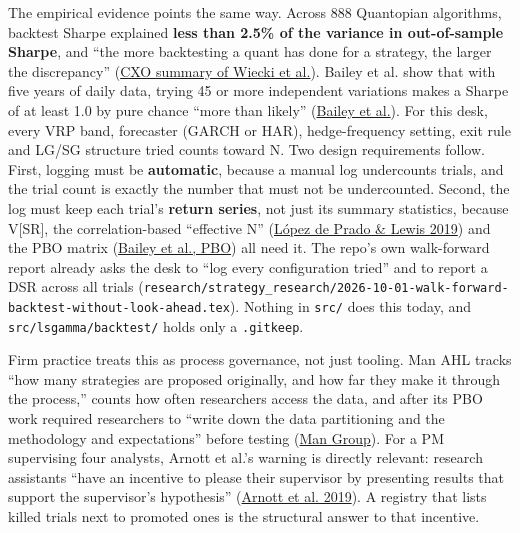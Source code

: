 \documentclass{article}
\begin{document}
The empirical evidence points the same way. Across 888 Quantopian algorithms, backtest Sharpe explained \textbf{less than 2.5\% of the variance in out-of-sample Sharpe}, and ``the more backtesting a quant has done for a strategy, the larger the discrepancy'' (\href{https://www.cxoadvisory.com/big-ideas/in-sample-vs-out-of-sample-performance-of-888-trading-strategies/}{CXO summary of Wiecki et al.}). Bailey et al. show that with five years of daily data, trying 45 or more independent variations makes a Sharpe of at least 1.0 by pure chance ``more than likely'' (\href{https://sdm.lbl.gov/oapapers/ssrn-id2507040-bailey.pdf}{Bailey et al.}). For this desk, every VRP band, forecaster (GARCH or HAR), hedge-frequency setting, exit rule and LG/\allowbreak{}SG structure tried counts toward N. Two design requirements follow. First, logging must be \textbf{automatic}, because a manual log undercounts trials, and the trial count is exactly the number that must not be undercounted. Second, the log must keep each trial's \textbf{return series}, not just its summary statistics, because V[SR], the correlation-based ``effective N'' (\href{https://papers.ssrn.com/sol3/papers.cfm?abstract_id=3167017}{López de Prado \& Lewis 2019}) and the PBO matrix (\href{https://www.davidhbailey.com/dhbpapers/backtest-prob.pdf}{Bailey et al., PBO}) all need it. The repo's own walk-forward report already asks the desk to ``log every configuration tried'' and to report a DSR across all trials (\texttt{research/\allowbreak{}strategy\_\allowbreak{}research/\allowbreak{}2026-\allowbreak{}10-\allowbreak{}01-\allowbreak{}walk-\allowbreak{}forward-\allowbreak{}backtest-\allowbreak{}without-\allowbreak{}look-\allowbreak{}ahead.\allowbreak{}tex}). Nothing in \texttt{src/\allowbreak{}} does this today, and \texttt{src/\allowbreak{}lsgamma/\allowbreak{}backtest/\allowbreak{}} holds only a \texttt{.\allowbreak{}gitkeep}.

Firm practice treats this as process governance, not just tooling. Man AHL tracks ``how many strategies are proposed originally, and how far they make it through the process,'' counts how often researchers access the data, and after its PBO work required researchers to ``write down the data partitioning and the methodology and expectations'' before testing (\href{https://www.man.com/insights/overfitting-and-its-impact-on-the-investor}{Man Group}). For a PM supervising four analysts, Arnott et al.'s warning is directly relevant: research assistants ``have an incentive to please their supervisor by presenting results that support the supervisor's hypothesis'' (\href{https://people.duke.edu/~charvey/Research/Published_Papers/P138_A_backtesting_protocol.pdf}{Arnott et al. 2019}). A registry that lists killed trials next to promoted ones is the structural answer to that incentive.
\end{document}
